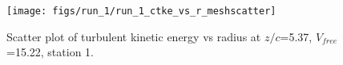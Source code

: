 \begin{figure}[H]
\centering
\texttt{[image: figs/run\_1/run\_1\_ctke\_vs\_r\_meshscatter]}
\caption{Scatter plot of turbulent kinetic energy vs radius at $z/c$=5.37, $V_{free}$=15.22, station 1.}
\label{fig:run_1_ctke_vs_r_meshscatter}
\end{figure}


